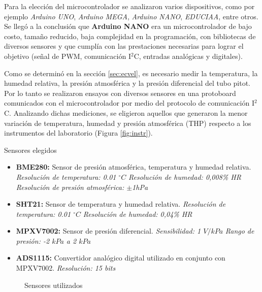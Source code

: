 Para la elección del microcontrolador se analizaron varios dispositivos, como por ejemplo \textit{Arduino UNO}, \textit{Arduino MEGA}, \textit{Arduino NANO}, \textit{EDUCIAA}, entre otros. Se llegó a la conclusión que \textbf{Arduino NANO} era un microcontrolador de bajo costo, tamaño reducido, baja complejidad en la programación, con bibliotecas de diversos sensores y que cumplía con las prestaciones necesarias para lograr el objetivo (señal de PWM, comunicación I$^2$C, entradas analógicas y digitales).

Como se determinó en la sección \ref{sec:ecvel}, es necesario medir la temperatura, la humedad relativa, la presión atmosférica y la presión diferencial del tubo pitot. Por lo tanto se realizaron ensayos con diversos sensores en una protoboard comunicados con el microcontrolador por medio del protocolo de comunicación I$^2$C. Analizando dichas mediciones, se eligieron aquellos que generaron la menor variación de temperatura, humedad y presión atmosférica (THP) respecto a los instrumentos del laboratorio (Figura \ref{fig:instr}). 

Sensores elegidos
\begin{itemize}
	\item  \textbf{BME280:} Sensor de presión atmosférica, temperatura y humedad relativa.
\subitem \textit{Resolución de temperatura: 0.01 $^{\circ}C$}
\subitem \textit{Resolución de humedad: 0,008\% HR}
\subitem \textit{Resolución de presión atmosférica: $\pm$1hPa}
	
	\item \textbf{SHT21:} Sensor de temperatura y humedad relativa.
\subitem \textit{Resolución de temperatura: 0.01 $^{\circ}C$}
\subitem \textit{Resolución de humedad: 0,04\% HR}	
	
	\item \textbf{MPXV7002:} Sensor de presión diferencial.
\subitem \textit{Sensibilidad: 1 $V/kPa$}
\subitem \textit{Rango de presión: -2 $kPa$ a 2 $kPa$}	
	
	\item \textbf{ADS1115:} Convertidor analógico digital utilizado en conjunto con MPXV7002.
\subitem \textit{Resolución: 15 bits}
\end{itemize}


\begin{figure}[htbp]
	\centering
	\caption{Sensores utilizados} \label{fig:senstodos}
\end{figure}




